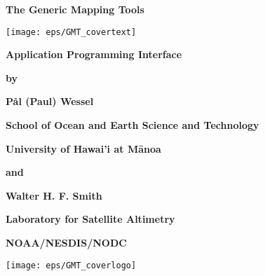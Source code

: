 \documentclass{report}
\begin{document}

\pagestyle{headings}

\thispagestyle{empty}

\begin{center}
\huge
\textbf{The Generic Mapping Tools}\par 
\vspace{0.5\baselineskip}

\texttt{[image: eps/GMT\_covertext]} 

\huge
\textbf{\GMTDOCVERSION}\par 
\vspace{0.25\baselineskip}

\Huge
\textbf{Application Programming Interface}\par 

\large
\vspace{0.75\baselineskip}
\textbf{by}\par 
\vspace{0.75\baselineskip}

\huge
\textbf{P\aa l (Paul) Wessel}\par 
\vspace{0.5\baselineskip}

\Large
\textbf{School of Ocean and Earth Science and Technology}\par 
\textbf{University of Hawai'i at M\={a}noa}\par 

\large
\vspace{0.75\baselineskip}
\textbf{and}\par 
\vspace{0.75\baselineskip}

\huge
\textbf{Walter H. F. Smith}\par 
\vspace{0.5\baselineskip}

\Large
\textbf{Laboratory for Satellite Altimetry}\par 
\textbf{NOAA/NESDIS/NODC}\par 
\vspace{0.5\baselineskip}

\large
\textbf{\GMTDOCDATE}\par 
\vspace{\baselineskip}

\texttt{[image: eps/GMT\_coverlogo]}

\end{center}
\clearpage

\thispagestyle{headings}
\end{document}
